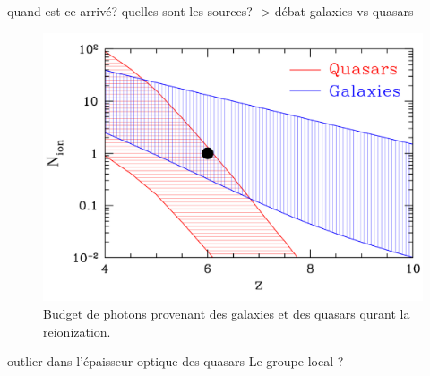 quand est ce arrivé?
quelles sont les sources? -> débat galaxies vs quasars
\begin{figure}[bth]
        \includegraphics[width=.95\linewidth]{img/01/gal_AGN.pdf} 
        \caption{
        Budget de photons provenant des galaxies et des quasars qurant la reionization.
}
 		\label{fig:gal_AGN}
\end{figure}

outlier dans l'épaisseur optique des quasars
Le groupe local ?
